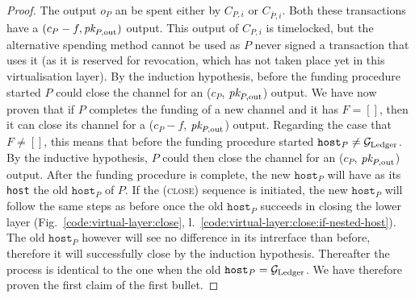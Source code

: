 \begin{proof}
  The output $o_P$ an be spent either by $C_{P, i}$ or $C_{\bar{P}, i}$.  Both
  these transactions have a $(c_P - f, \textit{pk}_{P, \mathrm{out}})$ output. This
  output of $C_{P, i}$ is timelocked, but the alternative spending method cannot
  be used as $P$ never signed a transaction that uses it (as it is reserved for
  revocation, which has not taken place yet in this virtualisation layer).  By
  the induction hypothesis, before the funding procedure started $P$ could close
  the channel for an ($c_P$, $\textit{pk}_{P, \mathrm{out}}$) output. We have now proven
  that if $P$ completes the funding of a new channel and it has $F = []$, then
  it can close its channel for a ($c_P - f$, $\textit{pk}_{P, \mathrm{out}}$) output.
   Regarding the case that $F \neq []$, this means that before the funding
  procedure started $\texttt{host}_P \neq \mathcal{G}_{\mathrm{Ledger}}$. By the inductive hypothesis,
  $P$ could then close the channel for an ($c_P$, $\textit{pk}_{P, \mathrm{out}}$)
  output. After the funding procedure is complete, the new $\texttt{host}_P$
  will have as its \texttt{host} the old $\texttt{host}_P$ of $P$. If the
  (\textsc{close}) sequence is initiated, the new $\texttt{host}_P$ will follow
  the same steps as before once the old $\texttt{host}_P$ succeeds in closing
  the lower layer (Fig.~\ref{code:virtual-layer:close},
  l.~\ref{code:virtual-layer:close:if-nested-host}). The old $\texttt{host}_P$
  however will see no difference in its intrerface than before, therefore it
  will successfully close by the induction hypothesis. Thereafter the process is
  identical to the one when the old $\texttt{host}_P = \mathcal{G}_{\mathrm{Ledger}}$. We have
  therefore proven the first claim of the first bullet.
\end{proof}

